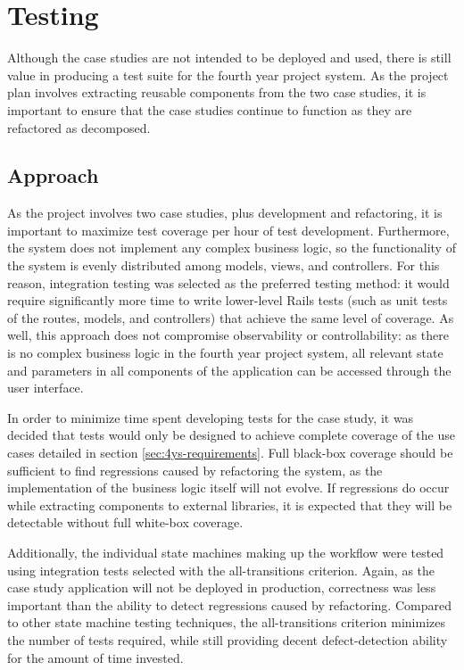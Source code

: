 \documentclass[document.tex]{subfiles}
\begin{document}
\section {Testing}

Although the case studies are not intended to be deployed and used, there is still value in producing a test suite for the fourth year project system.
As the project plan involves extracting reusable components from the two case studies, it is important to ensure that the case studies continue to function as they are refactored as decomposed.


\subsection {Approach}

As the project involves two case studies, plus development and refactoring,
it is important to maximize test coverage per hour of test development. Furthermore, the system does not implement any complex business logic, so the functionality of the system is evenly distributed among models, views, and controllers. For this reason, integration testing was selected as the preferred testing method: it would require significantly more time to write lower-level Rails tests (such as unit tests of the routes, models, and controllers) that achieve the same level of coverage. As well, this approach does not compromise observability or controllability: as there is no complex business logic in the fourth year project system, all relevant state and parameters in all components of the application can be accessed through the user interface.

In order to minimize time spent developing tests for the case study, it was decided that tests would only be designed to achieve complete coverage of the use cases detailed in section \ref{sec:4ys-requirements}. Full black-box coverage should be sufficient to find regressions caused by refactoring the system, as the implementation of the business logic itself will not evolve. If regressions do occur while extracting components to external libraries, it is expected that they will be detectable without full white-box coverage.

Additionally, the individual state machines making up the workflow were tested using integration tests selected with the all-transitions criterion. Again, as the case study application will not be deployed in production, correctness was less important than the ability to detect regressions caused by refactoring. Compared to other state machine testing techniques, the all-transitions criterion minimizes the number of tests required, while still providing decent defect-detection ability for the amount of time invested.
\end{document}
